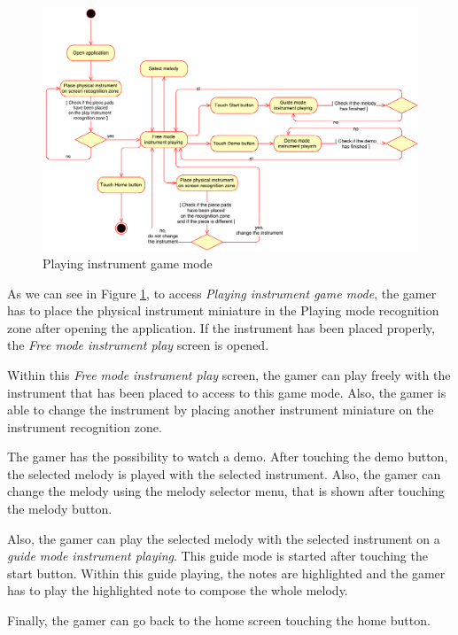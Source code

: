 \begin{figure}[ht!]
	\centering
	\includegraphics[width=400pt]{graphics/architecture/PlayingGameMode.pdf}
	\caption{Playing instrument game mode}
	\label{fig:playingworkflow}
\end{figure}

As we can see in Figure \ref{fig:playingworkflow}, to access \textit{Playing instrument game mode}, the gamer has to place the physical instrument miniature in the Playing mode recognition zone after opening the application. If the instrument has been placed properly, the \textit{Free mode instrument play} screen is opened.

Within this \textit{Free mode instrument play} screen, the gamer can play freely with the instrument that has been placed to access to this game mode. Also, the gamer is able to change the instrument by placing another instrument miniature on the instrument recognition zone.

The gamer has the possibility to watch a demo. After touching the demo button, the selected melody is played with the selected instrument. Also, the gamer can change the melody using the melody selector menu, that is shown after touching the melody button.

Also, the gamer can play the selected melody with the selected instrument on a \textit{guide mode instrument playing}. This guide mode is started after touching the start button. Within this guide playing, the notes are highlighted and the gamer has to play the highlighted note to compose the whole melody.

Finally, the gamer can go back to the home screen touching the home button.

\FloatBarrier

